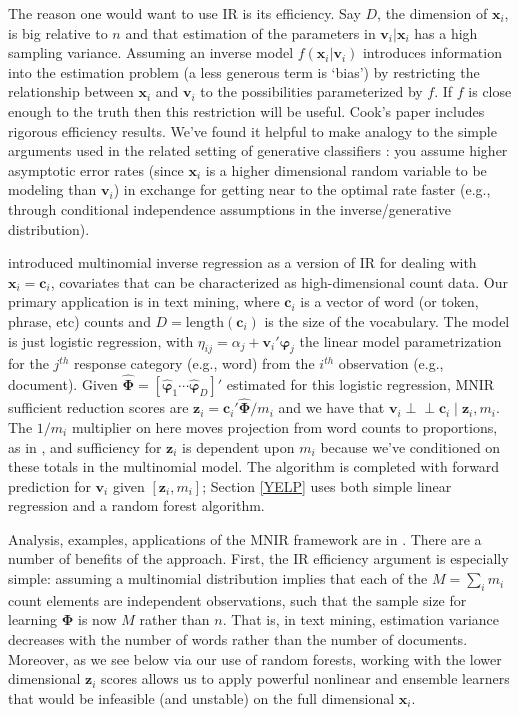 \documentclass[12pt]{article}
\newcommand{\bs}[1]{\boldsymbol{#1}}
\newcommand{\mr}[1]{\mathrm{#1}}
\newcommand{\bm}[1]{\mathbf{#1}}
\newcommand{\indep}{\perp\!\!\!\perp}
\begin{document}
The reason one would want to use IR is its efficiency.  Say $D$, the dimension
of $\bm{x}_i$, is big relative to $n$ and that estimation of the parameters in
$\bm{v}_i |\bm{x}_i$ has a high sampling variance.  Assuming an inverse model
$f(\bm{x}_i | \bm{v}_i)$ introduces information into the estimation problem (a
less generous term is `bias') by restricting the relationship between
$\bm{x}_i$ and $\bm{v}_i$ to the possibilities parameterized by $f$.  If $f$
is close enough to the truth then this restriction will be useful.  Cook's
paper includes rigorous efficiency results.  We've found it helpful to make
analogy to the simple arguments used in the related setting of generative
classifiers \citep[e.g., as in][for Gaussian
discrimination]{efron_efficiency_1975}: you  assume higher asymptotic error
rates (since $\bm{x}_i$ is a higher dimensional random variable to be modeling
than $\bm{v}_i$) in exchange for getting near to the optimal rate faster
(e.g., through conditional independence assumptions in the inverse/generative
distribution).

\cite{taddy_multinomial_2013} introduced multinomial inverse regression 
as a version of IR for dealing with $\bm{x}_i = \bm{c}_i$, covariates that can
be characterized as high-dimensional count data.  Our primary application is
in text mining, where $\bm{c}_i$ is a vector of word (or token, phrase,
etc) counts and $D=\mr{length}(\bm{c}_i)$ is the size of the vocabulary.  The
model is just logistic regression, with $\eta_{ij} = \alpha_j +
\bm{v}_i'\bs{\varphi}_j$ the linear model parametrization for the $j^{th}$
response category (e.g., word) from the $i^{th}$ observation (e.g., document).
Given $\bs{\hat\Phi} = [\bs{\hat\varphi}_1 \cdots \bs{\hat\varphi}_D]'$
estimated for this logistic regression, MNIR sufficient reduction scores are
$\bm{z}_i = \bm{c}_i'\bs{\hat\Phi}/m_i$ and we have that $\bm{v}_i \indep
\bm{c}_i \mid \bm{z}_i, m_i$. The $1/m_i$ multiplier on here moves projection
from word counts to proportions, as in
\cite{taddy_multinomial_2013}, and sufficiency for $\bm{z}_i$ is dependent
upon $m_i$ because we've conditioned on these totals in the 
multinomial model.  The algorithm is completed with forward prediction for $\bm{v}_i$ given $[\bm{z}_i,m_i]$; Section \ref{YELP} uses both simple linear regression and a random forest algorithm.

Analysis, examples, applications of the MNIR framework are in
\cite{taddy_measuring_2013,taddy_multinomial_2013,taddy_rejoinder:_2013}. 
There are a number of benefits of the approach.  First, the IR efficiency
argument is especially simple: assuming a multinomial distribution
implies that each of the $M = \sum_i m_i$ count elements are independent
observations, such that the sample size for learning $\bs{\Phi}$ is now $M$
rather than $n$.  That is, in text mining, estimation variance decreases with
the number of words rather than the number of documents. Moreover,
as we see below via our use of random forests, working with the lower dimensional $\bm{z}_i$ scores allows us to apply powerful nonlinear and ensemble learners that would be infeasible (and unstable) on the full dimensional $\bm{x}_i$.
\end{document}
